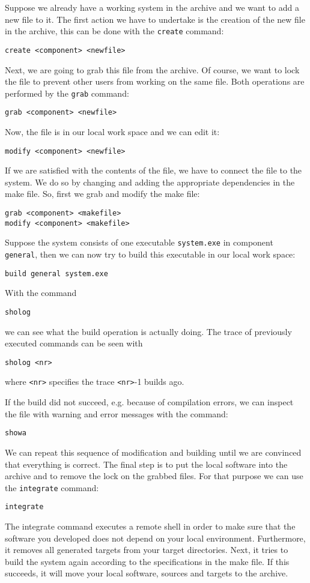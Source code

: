 Suppose we already have a working system in the archive and we want to add
a new file to it. The first action we have to undertake is the creation of
the new file in the archive, this can be done with the \verb+create+ command:
\begin{verbatim}
create <component> <newfile>
\end{verbatim}
Next, we are going to grab this file from the archive. Of course, we want
to lock the file to prevent other users from working on the same file. Both
operations are performed by the \verb+grab+ command:
\begin{verbatim}
grab <component> <newfile>
\end{verbatim}
Now, the file is in our local work space and we can edit it:
\begin{verbatim}
modify <component> <newfile>
\end{verbatim}
If we are satisfied with the contents of the file, we have to connect the
file to the system. We do so by changing and adding the appropriate dependencies
in the make file. So, first we grab and modify the make file:
\begin{verbatim}
grab <component> <makefile>
modify <component> <makefile>
\end{verbatim}
Suppose the system consists of one executable \verb+system.exe+ in component
\verb+general+, then we can now try to build this executable in our local
work space:
\begin{verbatim}
build general system.exe
\end{verbatim}
With the command
\begin{verbatim}
sholog
\end{verbatim}
we can see what the build operation is actually doing. The trace of
previously executed commands can be seen with
\begin{verbatim}
sholog <nr>
\end{verbatim}
where \verb+<nr>+ specifies the trace \verb+<nr>+-1 builds ago.

If the build did not succeed, e.g. because of compilation errors, we can 
inspect the file with warning and error messages with the command:
\begin{verbatim}
showa
\end{verbatim}
We can repeat this sequence of modification and building until we are convinced
that everything is correct. The final step is to put the local software into 
the archive and to remove the lock on the grabbed files. For that purpose
we can use the \verb+integrate+ command:
\begin{verbatim}
integrate
\end{verbatim}
The integrate command executes a remote shell in order
to make sure that the software you developed does not depend on your
local environment. Furthermore, it removes all generated targets from your
target directories. Next, it tries to build the system again according to
the specifications in the make file. If this succeeds, it will move your
local software, sources and targets to the archive.

